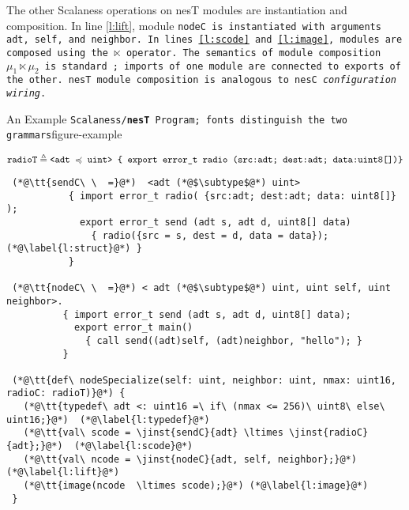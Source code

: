 The other Scalaness operations on nesT modules are instantiation and composition. In
line \ref{l:lift}, module \tt{nodeC} is instantiated with arguments
\tt{adt}, \tt{self}, and \tt{neighbor}. In lines \ref{l:scode} and
\ref{l:image}, modules are composed using the $\ltimes$ operator.
The semantics of module composition $\mu_1 \ltimes \mu_2$ is standard
\cite{cardelli97:_progr}; imports of one module are connected
to exports of the other. nesT module composition is analogous to nesC
\emph{configuration wiring}.%
\begin{fpfig*}[t]{An Example \tt{Scalaness}/{\bf \texttt{nesT}} Program; fonts distinguish the two grammars}{figure-example}
\lstset{numbers=left, numberstyle=\tiny, stepnumber=1, numbersep=5pt, basicstyle=\ttfamily} 

{\scriptsize\bf
$$
\mathtt{radioT} \triangleq \texttt{<adt $\preccurlyeq$ uint> \{ export error\_t radio ({src:adt; dest:adt; data:uint8[]})\}} 
$$
\begin{lstlisting}
 (*@\tt{sendC\ \  =}@*)  <adt (*@$\subtype$@*) uint>  
           { import error_t radio( {src:adt; dest:adt; data: uint8[]} );       
             export error_t send (adt s, adt d, uint8[] data) 
               { radio({src = s, dest = d, data = data}); (*@\label{l:struct}@*) }
           }
 
 (*@\tt{nodeC\ \  =}@*) < adt (*@$\subtype$@*) uint, uint self, uint neighbor>.
          { import error_t send (adt s, adt d, uint8[] data); 
            export error_t main() 
              { call send((adt)self, (adt)neighbor, "hello"); }   
          }
 
 (*@\tt{def\ nodeSpecialize(self: uint, neighbor: uint, nmax: uint16, radioC: radioT)}@*) {
   (*@\tt{typedef\ adt <: uint16 =\ if\ (nmax <= 256)\ uint8\ else\ uint16;}@*)  (*@\label{l:typedef}@*)   
   (*@\tt{val\ scode = \jinst{sendC}{adt} \ltimes \jinst{radioC}{adt};}@*)  (*@\label{l:scode}@*)    
   (*@\tt{val\ ncode = \jinst{nodeC}{adt, self, neighbor};}@*) (*@\label{l:lift}@*)    
   (*@\tt{image(ncode  \ltimes scode);}@*) (*@\label{l:image}@*)   
 }
\end{lstlisting}}%
\end{fpfig*}


